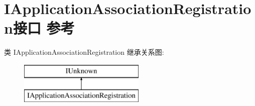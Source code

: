 \hypertarget{interface_i_application_association_registration}{}\section{I\+Application\+Association\+Registration接口 参考}
\label{interface_i_application_association_registration}
类 I\+Application\+Association\+Registration 继承关系图\+:\begin{figure}[H]
\begin{center}
\leavevmode
\includegraphics[height=2.000000cm]{interface_i_application_association_registration}
\end{center}
\end{figure}
